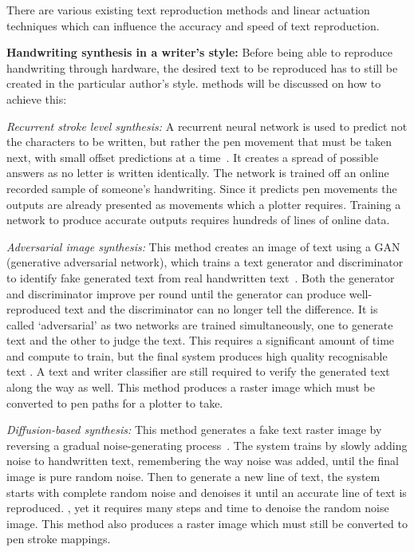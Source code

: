 There are various existing text reproduction methods and linear actuation techniques which can influence the accuracy and speed of text reproduction.

\textbf{Handwriting synthesis in a writer's style:} Before being able to reproduce handwriting through hardware, the desired text to be reproduced has to still be created in the particular author's style.  methods will be discussed on how to achieve this:

\emph{Recurrent stroke level synthesis:} A recurrent neural network is used to predict not the characters to be written, but rather the pen movement that must be taken next, with small offset predictions at a time~\cite{graves2013}. It creates a spread of possible answers as no letter is written identically. The network is trained off an online recorded sample of someone's handwriting. Since it predicts pen movements the outputs are already presented as movements which a plotter requires. Training a network to produce accurate outputs requires hundreds of lines of online data.

\emph{Adversarial image synthesis:} This method creates an image of text using a GAN (generative adversarial network), which trains a text generator and discriminator to identify fake generated text from real handwritten text~\cite{kang2020}. Both the generator and discriminator improve per round until the generator can produce well-reproduced text and the discriminator can no longer tell the difference. It is called `adversarial' as two networks are trained simultaneously, one to generate text and the other to judge the text. This requires a significant amount of time and compute to train, but the final system produces high quality recognisable text . A text and writer classifier are still required to verify the generated text along the way as well. This method produces a raster image which must be converted to pen paths for a plotter to take.

\emph{Diffusion-based synthesis:} This method generates a fake text raster image by reversing a gradual noise-generating process~\cite{dai2024}. The system trains by slowly adding noise to handwritten text, remembering the way noise was added, until the final image is pure random noise. Then to generate a new line of text, the system starts with complete random noise and denoises it until an accurate line of text is reproduced. , yet it requires many steps and time to denoise the random noise image. This method also produces a raster image which must still be converted to pen stroke mappings.

